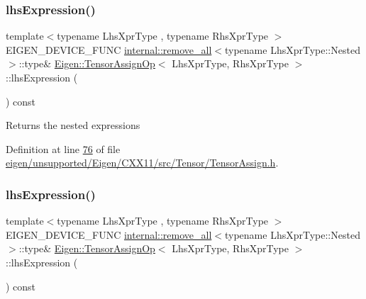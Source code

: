 \subsubsection{\texorpdfstring{lhs\+Expression()}{lhsExpression()}\hspace{0.1cm}{\footnotesize\ttfamily [1/2]}}
{\footnotesize\ttfamily template$<$typename Lhs\+Xpr\+Type , typename Rhs\+Xpr\+Type $>$ \\
E\+I\+G\+E\+N\+\_\+\+D\+E\+V\+I\+C\+E\+\_\+\+F\+U\+NC \hyperlink{struct_eigen_1_1internal_1_1remove__all}{internal\+::remove\+\_\+all}$<$typename Lhs\+Xpr\+Type\+::\+Nested$>$\+::type\& \hyperlink{class_eigen_1_1_tensor_assign_op}{Eigen\+::\+Tensor\+Assign\+Op}$<$ Lhs\+Xpr\+Type, Rhs\+Xpr\+Type $>$\+::lhs\+Expression (\begin{DoxyParamCaption}{ }\end{DoxyParamCaption}) const\hspace{0.3cm}{\ttfamily [inline]}}

\begin{DoxyReturn}{Returns}
the nested expressions 
\end{DoxyReturn}


Definition at line \hyperlink{eigen_2unsupported_2_eigen_2_c_x_x11_2src_2_tensor_2_tensor_assign_8h_source_l00076}{76} of file \hyperlink{eigen_2unsupported_2_eigen_2_c_x_x11_2src_2_tensor_2_tensor_assign_8h_source}{eigen/unsupported/\+Eigen/\+C\+X\+X11/src/\+Tensor/\+Tensor\+Assign.\+h}.

\mbox{\label{class_eigen_1_1_tensor_assign_op_a1a6f7336727e3f95616014883d514caa}} 
\subsubsection{\texorpdfstring{lhs\+Expression()}{lhsExpression()}\hspace{0.1cm}{\footnotesize\ttfamily [2/2]}}
{\footnotesize\ttfamily template$<$typename Lhs\+Xpr\+Type , typename Rhs\+Xpr\+Type $>$ \\
E\+I\+G\+E\+N\+\_\+\+D\+E\+V\+I\+C\+E\+\_\+\+F\+U\+NC \hyperlink{struct_eigen_1_1internal_1_1remove__all}{internal\+::remove\+\_\+all}$<$typename Lhs\+Xpr\+Type\+::\+Nested$>$\+::type\& \hyperlink{class_eigen_1_1_tensor_assign_op}{Eigen\+::\+Tensor\+Assign\+Op}$<$ Lhs\+Xpr\+Type, Rhs\+Xpr\+Type $>$\+::lhs\+Expression (\begin{DoxyParamCaption}{ }\end{DoxyParamCaption}) const\hspace{0.3cm}{\ttfamily [inline]}}


